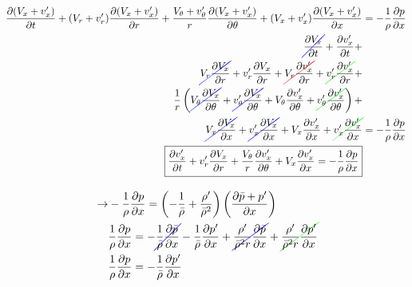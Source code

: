 \begin{align*} 
\frac{\partial (V_x + v_x') }{\partial t} + 
( V_r + v_r' ) 
\frac{\partial( V_x + v_x')}{\partial r} +
\frac{V_{\theta} + v_{\theta}'}{r}
\frac{\partial(V_x + v_x')}{\partial \theta} + 
(V_x + v_x') 
\frac{\partial (V_x + v_x')}{\partial x} 	
&= -\frac{1}{\rho } \frac{\partial p}{\partial x}\\
\Ccancel[blue]  {\frac{\partial  V_x  }{\partial t}}	+
\frac{\partial  v_x' }{\partial t} + \\
\Ccancel[blue]  {V_r  \frac{\partial  V_x  }{\partial r}}  +
v_r' \frac{\partial  V_x  }{\partial r} + 
\Ccancel[red]{V_r  \frac{\partial  v_x' }{\partial r}} + 
\Ccancel[green]{v_r' \frac{\partial  v_x' }{\partial r}} +\\
\frac{1}{r}
\left(
\Ccancel[blue]  {V_{\theta} \frac{\partial V_x}{\partial \theta}} +
\Ccancel[blue] {v_{\theta}'\frac{\partial V_x}{\partial \theta}} +
V_{\theta} \frac{\partial v'_x}{\partial \theta} +
\Ccancel[green]{v_{\theta}'\frac{\partial v'_x}{\partial \theta}}
\right)+ \\
\Ccancel[blue]{V_x \frac{\partial V_x }{\partial x}} +
\Ccancel[blue]{v_x'\frac{\partial V_x }{\partial x}} +  
V_x \frac{\partial v_x'}{\partial x} +
\Ccancel[green]{v_x' \frac{\partial v_x'}{\partial x}} 
&= -\frac{1}{\rho } 
\frac{\partial p}{\partial x} \\
\boxed{\frac{\partial  v_x' }{\partial t} +
	v_r' \frac{\partial  V_x  }{\partial r} +
	\frac{V_{\theta}}{r} \frac{\partial v'_x}{\partial \theta} +
	V_x \frac{\partial v_x'}{\partial x} 
	= -\frac{1}{\rho } 
	\frac{\partial p}{\partial x}}
\end{align*}
\[
\]
\newpage
\begin{align*}
\text{} \rightarrow&
-\frac{1}{\rho }\frac{\partial p}{\partial x} = \left( -\frac{1    }{\bar{\rho}} +
\frac{\rho'}{\bar{\rho}^2}\right) \left(\frac{\partial \bar{p} + p'}{\partial x}\right)\\
&\frac{1}{\rho }\frac{\partial p}{\partial x} =  -\Ccancel[blue]{\frac{1    }{\bar{\rho}}  \frac{\partial \bar{p}}{\partial x}} -  
\frac{1    }{\bar{\rho} }  \frac{\partial p'}{\partial x} +
\Ccancel[blue]{\frac{\rho'}{\bar{\rho}^2 r}\frac{\partial \bar{p}}{\partial x}} +
\Ccancel[green]{\frac{\rho'}{\bar{\rho}^2 r}\frac{\partial p'}{\partial x}}\\
&\frac{1}{\rho }\frac{\partial p}{\partial x} =  -\frac{1    }{\bar{\rho}}  \frac{\partial p'}{\partial x} 
\end{align*}

